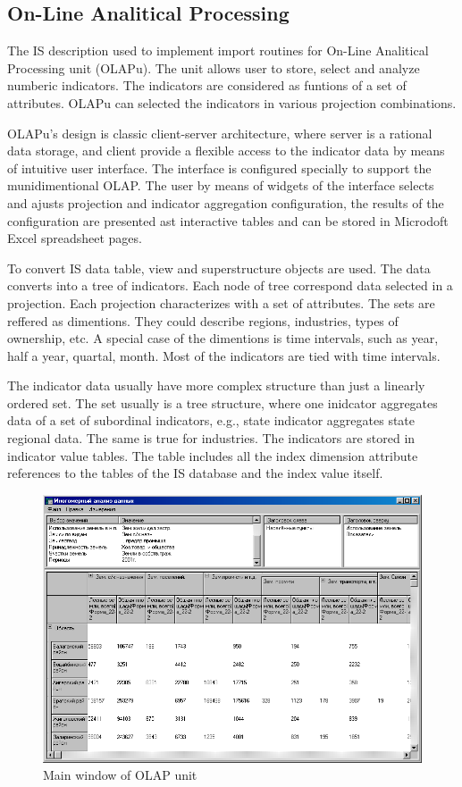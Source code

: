 \documentclass[conference]{IEEEtran}
\begin{document}
\subsection{On-Line Analitical Processing}
\label{sec:olap}

The IS description used to implement import routines for On-Line Analitical Processing unit (OLAPu).  The unit allows user to store, select and analyze numberic indicators.  The indicators are considered as funtions of a set of attributes.  OLAPu can
selected the indicators in various projection combinations.

OLAPu's design is classic client-server architecture, where server is a rational data storage, and client provide a flexible access to the indicator data by means of intuitive user interface.  The interface is configured specially to support the munidimentional OLAP.  The user by means of widgets of the interface selects and ajusts projection and indicator aggregation configuration, the results of the configuration are presented ast interactive tables and can be stored in Microdoft Excel spreadsheet pages.

To convert IS data {table}, {view} and {superstructure} objects are used.  The data converts into a tree of indicators.  Each node of tree correspond data selected in a projection.  Each projection characterizes with a set of attributes.  The sets are reffered as dimentions.  They could describe regions, industries, types of ownership, etc.  A special case of the dimentions is time intervals, such as year, half a year, quartal, month.  Most of the indicators are tied with time intervals.

The indicator data usually have more complex structure than just a linearly ordered set.  The set usually is a tree structure, where one inidcator aggregates data of a set of subordinal indicators, e.g., state indicator aggregates state regional data.  The same is true for industries.  The indicators are stored in indicator value tables.  The table includes all the index dimension attribute references to the tables of the IS database and the index value itself.

\begin{figure}[bt]
  \centering
  \includegraphics[width=\linewidth]{MDA-olap.png}
  \caption{Main window of OLAP unit}
  \label{fig:olapu}
\end{figure}
\end{document}
